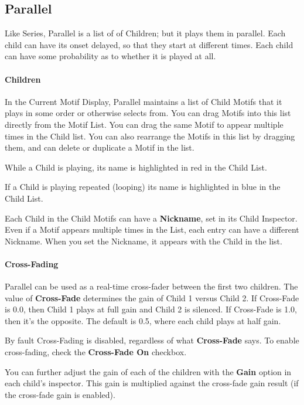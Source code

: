 \documentclass[twoside,10pt]{article}
\begin{document}
\subsection{Parallel}
\label{parallelmotif}

Like Series, Parallel is a list of of Children; but it plays them in parallel.  Each child can have its onset delayed, so that they start at different times.  Each child can have some probability as to whether it is played at all.

\paragraph{Children}

In the Current Motif Display, Parallel maintains a list of Child Motifs that it plays in some order or otherwise selects from.  You can drag Motifs into this list directly from the Motif List.  You can drag the same Motif to appear multiple times in the Child list.  You can also rearrange the Motifs in this list by dragging them, and can delete or duplicate a Motif in the list.

While a Child is playing, its name is highlighted in red in the Child List.

If a Child is playing repeated (looping) its name is highlighted in blue in the Child List.

Each Child in the Child Motifs can have a {\bf Nickname}, set in its Child Inspector.  Even if a Motif appears multiple times in the List, each entry can have a different Nickname.  When you set the Nickname, it appears with the Child in the list.

\paragraph{Cross-Fading}

Parallel can be used as a real-time cross-fader between the first two children.  The value of {\bf Cross-Fade} determines the gain of Child 1 versus Child 2.  If Cross-Fade is 0.0, then Child 1 plays at full gain and Child 2 is silenced.  If Cross-Fade is 1.0, then it's the opposite.  The default is 0.5, where each child plays at half gain.

By fault Cross-Fading is disabled, regardless of what {\bf Cross-Fade} says.  To enable cross-fading, check the {\bf Cross-Fade On} checkbox.

You can further adjust the gain of each of the children with the {\bf Gain} option in each child's inspector.  This gain is multiplied against the cross-fade gain result (if the cross-fade gain is enabled).
\end{document}

